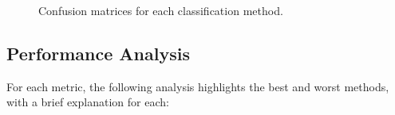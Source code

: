 \documentclass{article}
\begin{document}
\begin{figure}[H]
	\hspace{1em}
	\caption{Confusion matrices for each classification method.}
	\label{fig:confusion_matrices}
\end{figure}

\subsection{Performance Analysis}

For each metric, the following analysis highlights the best and worst methods, with a brief explanation for each:
\end{document}
